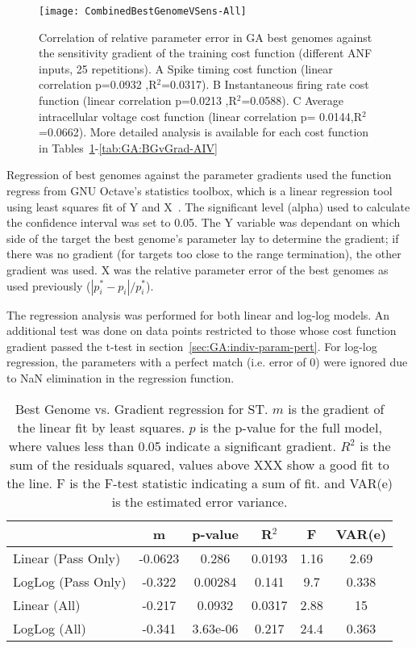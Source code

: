 \begin{figure}[th]
  \centering
  \texttt{[image: CombinedBestGenomeVSens-All]}  
  \caption{Correlation of relative parameter error in GA best genomes
    against the sensitivity gradient of the training cost function
    (different ANF inputs, 25 repetitions). A Spike timing cost
    function (linear correlation p=0.0932 ,R$^2$=0.0317). B
    Instantaneous firing rate cost function (linear correlation
    p=0.0213 ,R$^2$=0.0588).  C Average intracellular voltage cost
    function (linear correlation p= 0.0144,R$^2$=0.0662).  More
    detailed analysis is available for each cost function in
    Tables~\ref{tab:GA:BGvGrad-ST}-\ref{tab:GA:BGvGrad-AIV}}
  \label{fig:GA:BestGenomeVGradient}
\end{figure}
% 

Regression of best genomes against the parameter gradients used the
function \textsf{regress} from GNU Octave's \textsf{statistics}
toolbox, which is a linear regression tool using least squares fit of
Y and X~\citep{Eaton:2002}. The significant level (alpha) used to
calculate the confidence interval was set to 0.05. The Y variable was
dependant on which side of the target the best genome's parameter lay
to determine the gradient; if there was no gradient (for targets too
close to the range termination), the other gradient was used. X was
the relative parameter error of the best genomes as used previously
($\left|p^\ast_i-{p}_i\right|/p^\ast_i$).

\smallskip{}

The regression analysis was performed for both linear and log-log
models. An additional test was done on data points restricted to those
whose cost function gradient passed the t-test in
section~\ref{sec:GA:indiv-param-pert}. For log-log regression, the
parameters with a perfect match (i.e. error of 0) were ignored due to
NaN elimination in the regression function.

\smallskip{}

\begin{table}[th]
  \centering
  \begin{tabular}{lccccc}
\toprule
                   &    m    & p-value  & R$^2$ &  F  & VAR(e) \\[1ex] \midrule
Linear (Pass Only) & -0.0623 &  0.286   & 0.0193& 1.16& 2.69   \\
LogLog (Pass Only) & -0.322  & 0.00284  & 0.141 & 9.7 & 0.338 \\[0.5ex] \hline
   Linear (All)    & -0.217  &  0.0932  & 0.0317& 2.88& 15     \\
   LogLog (All)    & -0.341  & 3.63e-06 & 0.217 & 24.4& 0.363 \\[1ex] \hline    
 \end{tabular}
 \caption{Best Genome vs. Gradient regression for ST. $m$ is the gradient of the    linear fit by least squares. $p$ is the p-value for the full model, where values  less than 0.05 indicate a significant gradient. $R^2$ is the sum of the residuals  squared, values above XXX show a good fit to the line.  F is the F-test statistic  indicating a sum of fit.  and VAR(e) is the estimated error variance.  }
  \label{tab:GA:BGvGrad-ST}
\end{table}


